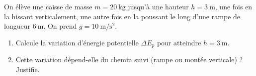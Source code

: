 \documentclass[11pt,a4paper]{article}
\begin{document}
\begin{exo}
On élève une caisse de masse $m=\qty{20}{\kilogram}$ jusqu'à une hauteur $h=\qty{3}{\metre}$, une fois
en la hissant verticalement, une autre fois en la poussant le long d'une rampe de longueur
$\qty{6}{\metre}$. On prend $g=\qty{10}{\metre\per\second\squared}$.
\begin{enumerate}[label=\alph*)]
  \item Calcule la variation d'énergie potentielle $\Delta E_p$ pour atteindre $h=\qty{3}{\metre}$.
  \item Cette variation dépend-elle du chemin suivi (rampe ou montée verticale) ? Justifie.
\end{enumerate}
\end{exo}
\end{document}
